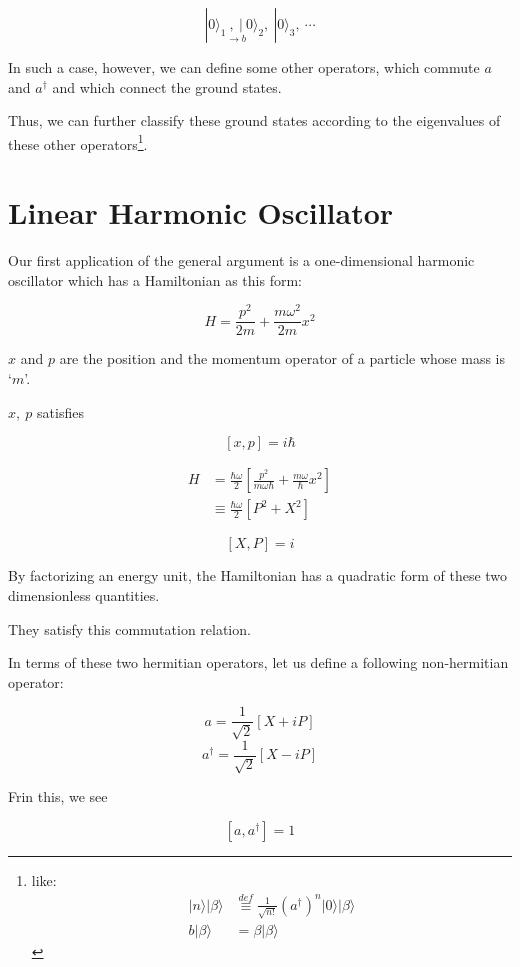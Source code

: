﻿\documentclass[twoside]{book}
\numberwithin{equation}{section}
\begin{document}
\[|0\rangle_1\underset{\rightarrow b}{,\ |}0\rangle_2,\ |0\rangle_3,\ \cdots \]

In such a case, however, we can define some other operators, which commute $a$ and $a^{\dagger}$ and which connect the ground states.

Thus, we can further classify these ground states according to the eigenvalues of these other operators\footnote{like:
\[\begin{split}|n\rangle|\beta\rangle &\overset{def}{\equiv}\frac{1}{\sqrt{n!}}(a^{\dagger})^n|0\rangle|\beta\rangle \\
b|\beta\rangle &= \beta|\beta\rangle
\end{split}\]}.



\section{Linear Harmonic Oscillator}


Our first application of the general argument is a one-dimensional harmonic oscillator which has a Hamiltonian as this form:

\begin{equation}
H = \frac{p^2}{2m}+\frac{m\omega^2}{2m}x^2
\end{equation}

$x$ and $p$ are the position and the momentum operator of a particle whose mass is `$m$'.

$x,\ p$ satisfies

\[[x, p] = i\hbar \]

\[\begin{split}
H &= \frac{\hbar\omega}{2}\left[\frac{p^2}{m\omega\hbar}+\frac{m\omega}{\hbar}x^2\right]\\
&\equiv\frac{\hbar\omega}{2}[P^2+X^2]
\end{split} \]

\[[X, P] = i \]

By factorizing an energy unit, the Hamiltonian has a quadratic form of these two dimensionless quantities. 

They satisfy this commutation relation. 

In terms of these two hermitian operators, let us define a following non-hermitian operator:

\[a = \frac{1}{\sqrt{2}}[X+iP] \]
\[a^\dagger = \frac{1}{\sqrt{2}}[X-iP] \]

Frin this, we see

\[[a,a^\dagger] = 1 \]
\end{document}
